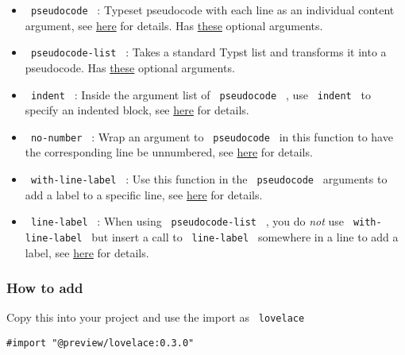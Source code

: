 \begin{itemize}
\tightlist
\item
  \texttt{\ pseudocode\ } : Typeset pseudocode with each line as an
  individual content argument, see
  \href{https://github.com/typst/packages/raw/main/packages/preview/lovelace/0.3.0/\#lower-level-interface}{here}
  for details. Has
  \href{https://github.com/typst/packages/raw/main/packages/preview/lovelace/0.3.0/\#customisation-overview}{these}
  optional arguments.
\item
  \texttt{\ pseudocode-list\ } : Takes a standard Typst list and
  transforms it into a pseudocode. Has
  \href{https://github.com/typst/packages/raw/main/packages/preview/lovelace/0.3.0/\#customisation-overview}{these}
  optional arguments.
\item
  \texttt{\ indent\ } : Inside the argument list of
  \texttt{\ pseudocode\ } , use \texttt{\ indent\ } to specify an
  indented block, see
  \href{https://github.com/typst/packages/raw/main/packages/preview/lovelace/0.3.0/\#lower-level-interface}{here}
  for details.
\item
  \texttt{\ no-number\ } : Wrap an argument to \texttt{\ pseudocode\ }
  in this function to have the corresponding line be unnumbered, see
  \href{https://github.com/typst/packages/raw/main/packages/preview/lovelace/0.3.0/\#line-numbers}{here}
  for details.
\item
  \texttt{\ with-line-label\ } : Use this function in the
  \texttt{\ pseudocode\ } arguments to add a label to a specific line,
  see
  \href{https://github.com/typst/packages/raw/main/packages/preview/lovelace/0.3.0/\#referencing-lines}{here}
  for details.
\item
  \texttt{\ line-label\ } : When using \texttt{\ pseudocode-list\ } ,
  you do \emph{not} use \texttt{\ with-line-label\ } but insert a call
  to \texttt{\ line-label\ } somewhere in a line to add a label, see
  \href{https://github.com/typst/packages/raw/main/packages/preview/lovelace/0.3.0/\#referencing-lines}{here}
  for details.
\end{itemize}

\subsubsection{How to add}\label{how-to-add}

Copy this into your project and use the import as \texttt{\ lovelace\ }

\begin{verbatim}
#import "@preview/lovelace:0.3.0"
\end{verbatim}

